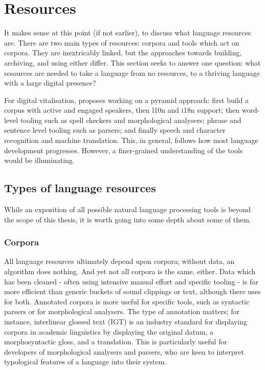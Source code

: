 \section{Resources}
\label{sec:resources}

It makes sense at this point (if not earlier), to discuss what language resources are. There are two main types of resources: corpora and tools which act on corpora. They are inextricably linked, but the approaches towards building, archiving, and using either differ. This section seeks to answer one question: what resources are needed to take a language from no resources, to a thriving language with a large digital presence?

For digital vitalisation, \citet{kornai2015new} proposes working on a pyramid approach: first build a corpus with active and engaged speakers, then l10n and i18n support; then word-level tooling such as spell checkers and morphological analysers; phrase and sentence level tooling such as parsers; and finally speech and character recognition and machine translation. This, in general, follows how most language development progresses. However, a finer-grained understanding of the tools would be illuminating.

\subsection{Types of language resources}

 While an exposition of all possible natural language processing tools is beyond the scope of this thesis, it is worth going into some depth about some of them.

\subsubsection{Corpora}

All language resources ultimately depend upon corpora; without data, an algorithm does nothing. And yet not all corpora is the same, either. Data which has been cleaned - often using intensive manual effort and specific tooling - is far more efficient than generic buckets of sound clippings or text, although there uses for both. Annotated corpora is more useful for specific tools, such as syntactic parsers or for morphological analysers. The type of annotation matters; for instance, interlinear glossed text (IGT) is an industry standard for displaying corpora in academic linguistics by displaying the original datum, a morphosyntactic gloss, and a translation. This is particularly useful for developers of morphological analysers and parsers, who are keen to interpret typological features of a language into their system.

